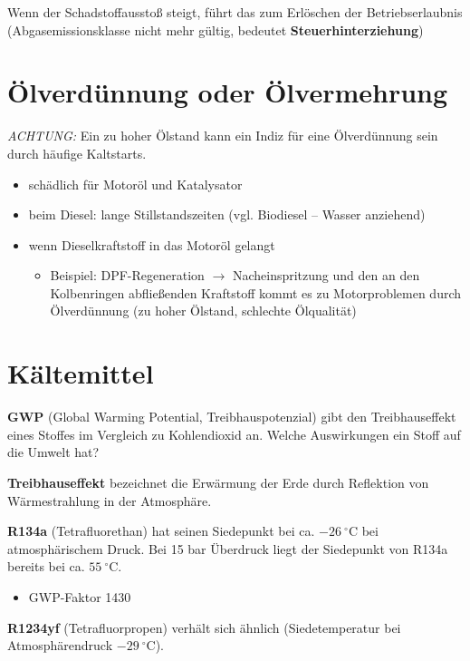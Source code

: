 Wenn der Schadstoffausstoß steigt, führt das zum Erlöschen der
Betriebserlaubnis (Abgasemissionsklasse nicht mehr gültig, bedeutet
\textbf{Steuerhinterziehung})

\section{Ölverdünnung oder
Ölvermehrung}\label{oelverduennung-oder-oelvermehrung}

\emph{ACHTUNG:} Ein zu hoher Ölstand kann ein Indiz für eine
Ölverdünnung sein durch häufige Kaltstarts.

\begin{itemize}
\item
  schädlich für Motoröl und Katalysator
\item
  beim Diesel: lange Stillstandszeiten (vgl. Biodiesel -- Wasser
  anziehend)
\item
  wenn Dieselkraftstoff in das Motoröl gelangt

  \begin{itemize}
  \item
    Beispiel: DPF-Regeneration $\to$ Nacheinspritzung und den an den
    Kolbenringen abfließenden Kraftstoff kommt es zu Motorproblemen
    durch Ölverdünnung (zu hoher Ölstand, schlechte Ölqualität)
  \end{itemize}
\end{itemize}

\section{Kältemittel}\label{kaeltemittel}

\textbf{GWP} (Global Warming Potential, Treibhauspotenzial) gibt den
Treibhauseffekt eines Stoffes im Vergleich zu Kohlendioxid an. Welche
Auswirkungen ein Stoff auf die Umwelt hat?

\textbf{Treibhauseffekt} bezeichnet die Erwärmung der Erde durch
Reflektion von Wärmestrahlung in der Atmosphäre.

\textbf{R134a} (Tetrafluorethan) hat seinen Siedepunkt bei ca.
$-26~^\circ\text{C}$ bei atmosphärischem Druck. Bei 15 bar Überdruck
liegt der Siedepunkt von R134a bereits bei ca. $55~^\circ\text{C}$.

\begin{itemize}
\item
  GWP-Faktor 1430
\end{itemize}

\textbf{R1234yf} (Tetrafluorpropen) verhält sich ähnlich
(Siedetemperatur bei Atmosphärendruck $-29~^\circ\text{C}$).


